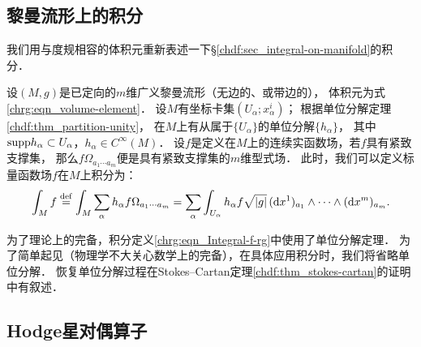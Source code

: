 \subsection{黎曼流形上的积分}\label{chrg:sec_integral}

我们用与度规相容的体积元重新表述一下\S\ref{chdf:sec_integral-on-manifold}的积分．

设$(M,g)$是已定向的$m$维广义黎曼流形（无边的、或带边的），
体积元为式\eqref{chrg:eqn_volume-element}．
设$M$有坐标卡集$(U_\alpha;x^i_\alpha)$；
根据单位分解定理\ref{chdf:thm_partition-unity}，
在$M$上有从属于$\{U_\alpha\}$的单位分解$\{h_\alpha\}$，
其中${\rm supp}h_\alpha \subset U_\alpha$，$h_\alpha \in C^\infty(M)$．
设$f$是定义在$M$上的连续实函数场，若$f$具有紧致支撑集，
那么$f \Omega_{a_1 \cdots a_m}$便是具有紧致支撑集的$m$维型式场．
此时，我们可以定义标量函数场$f$在$M$上积分为：
\begin{equation}\label{chrg:eqn_Integral-f-rg}
	\int_M f \overset{\mathrm {def}}{=} \int_{M} \sum_{\alpha}  
	h_\alpha  f  \Omega_{a_1 \cdots a_m} 
	= \sum_{\alpha}  \int_{U_\alpha} h_\alpha f \sqrt{|g|}\, 
	({\rm d}x^1)_{a_1} \wedge \cdots \wedge({\rm d}x^m)_{a_m} .
\end{equation}

为了理论上的完备，积分定义\eqref{chrg:eqn_Integral-f-rg}中使用了单位分解定理．
为了简单起见（物理学不大关心数学上的完备），在具体应用积分时，我们将省略单位分解．
恢复单位分解过程在Stokes--Cartan定理\ref{chdf:thm_stokes-cartan}的证明中有叙述．


\subsection{Hodge星对偶算子}\label{chrg:sec_Hodge}

